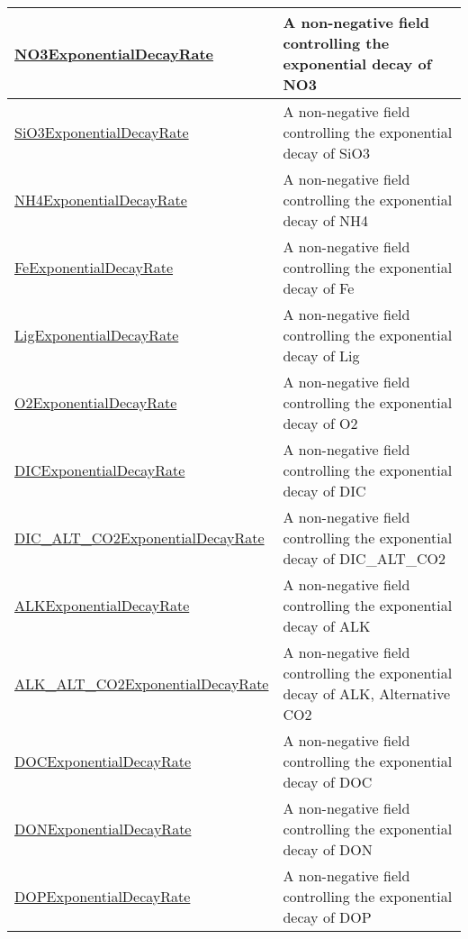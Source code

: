 {\begin{center}
\begin{longtable}{| p{2.0in} | p{4.0in} |}
    \hline
    \hyperref[subsec:var_sec_forcing_NO3ExponentialDecayRate]{NO3ExponentialDecayRate} & A non-negative field controlling the exponential decay of NO3 \\
    \hline
    \hyperref[subsec:var_sec_forcing_SiO3ExponentialDecayRate]{SiO3ExponentialDecayRate} & A non-negative field controlling the exponential decay of SiO3 \\
    \hline
    \hyperref[subsec:var_sec_forcing_NH4ExponentialDecayRate]{NH4ExponentialDecayRate} & A non-negative field controlling the exponential decay of NH4 \\
    \hline
    \hyperref[subsec:var_sec_forcing_FeExponentialDecayRate]{FeExponentialDecayRate} & A non-negative field controlling the exponential decay of Fe \\
    \hline
    \hyperref[subsec:var_sec_forcing_LigExponentialDecayRate]{LigExponentialDecayRate} & A non-negative field controlling the exponential decay of Lig \\
    \hline
    \hyperref[subsec:var_sec_forcing_O2ExponentialDecayRate]{O2ExponentialDecayRate} & A non-negative field controlling the exponential decay of O2 \\
    \hline
    \hyperref[subsec:var_sec_forcing_DICExponentialDecayRate]{DICExponentialDecayRate} & A non-negative field controlling the exponential decay of DIC \\
    \hline
    \hyperref[subsec:var_sec_forcing_DIC_ALT_CO2ExponentialDecayRate]{DIC\_ALT\_CO2Exponential\-DecayRate} & A non-negative field controlling the exponential decay of DIC\_ALT\_CO2 \\
    \hline
    \hyperref[subsec:var_sec_forcing_ALKExponentialDecayRate]{ALKExponentialDecayRate} & A non-negative field controlling the exponential decay of ALK \\
    \hline
    \hyperref[subsec:var_sec_forcing_ALK_ALT_CO2ExponentialDecayRate]{ALK\_ALT\_CO2Exponential\-DecayRate} & A non-negative field controlling the exponential decay of ALK, Alternative CO2 \\
    \hline
    \hyperref[subsec:var_sec_forcing_DOCExponentialDecayRate]{DOCExponentialDecayRate} & A non-negative field controlling the exponential decay of DOC \\
    \hline
    \hyperref[subsec:var_sec_forcing_DONExponentialDecayRate]{DONExponentialDecayRate} & A non-negative field controlling the exponential decay of DON \\
    \hline
    \hyperref[subsec:var_sec_forcing_DOPExponentialDecayRate]{DOPExponentialDecayRate} & A non-negative field controlling the exponential decay of DOP \\

\end{longtable}
\end{center}}
